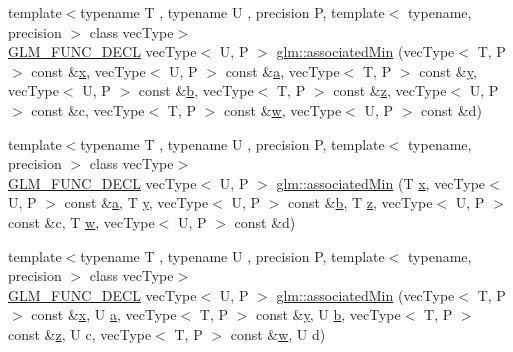 \begin{DoxyCompactItemize}
{\footnotesize template$<$typename T , typename U , precision P, template$<$ typename, precision $>$ class vec\+Type$>$ }\\\mbox{\hyperlink{setup_8hpp_ab2d052de21a70539923e9bcbf6e83a51}{G\+L\+M\+\_\+\+F\+U\+N\+C\+\_\+\+D\+E\+CL}} vec\+Type$<$ U, P $>$ \mbox{\hyperlink{group__gtx__associated__min__max_ga88e031f22b80215505928900d3dde549}{glm\+::associated\+Min}} (vec\+Type$<$ T, P $>$ const \&\mbox{\hyperlink{glad_8h_a92d0386e5c19fb81ea88c9f99644ab1d}{x}}, vec\+Type$<$ U, P $>$ const \&\mbox{\hyperlink{glad_8h_ac8729153468b5dcf13f971b21d84d4e5}{a}}, vec\+Type$<$ T, P $>$ const \&\mbox{\hyperlink{glad_8h_a66ddd433d2cacfe27f5906b7e86faeed}{y}}, vec\+Type$<$ U, P $>$ const \&\mbox{\hyperlink{glad_8h_a6eba317e3cf44d6d26c04a5a8f197dcb}{b}}, vec\+Type$<$ T, P $>$ const \&\mbox{\hyperlink{glad_8h_acb78bf1972d3eaf07da34ff2e0a2f133}{z}}, vec\+Type$<$ U, P $>$ const \&c, vec\+Type$<$ T, P $>$ const \&\mbox{\hyperlink{glad_8h_a1d0296e9e835f2e1ee17634af95fc1ec}{w}}, vec\+Type$<$ U, P $>$ const \&d)
\item 
{\footnotesize template$<$typename T , typename U , precision P, template$<$ typename, precision $>$ class vec\+Type$>$ }\\\mbox{\hyperlink{setup_8hpp_ab2d052de21a70539923e9bcbf6e83a51}{G\+L\+M\+\_\+\+F\+U\+N\+C\+\_\+\+D\+E\+CL}} vec\+Type$<$ U, P $>$ \mbox{\hyperlink{group__gtx__associated__min__max_ga0f63b0dce5a5c3242cc6d9847e7d14f1}{glm\+::associated\+Min}} (T \mbox{\hyperlink{glad_8h_a92d0386e5c19fb81ea88c9f99644ab1d}{x}}, vec\+Type$<$ U, P $>$ const \&\mbox{\hyperlink{glad_8h_ac8729153468b5dcf13f971b21d84d4e5}{a}}, T \mbox{\hyperlink{glad_8h_a66ddd433d2cacfe27f5906b7e86faeed}{y}}, vec\+Type$<$ U, P $>$ const \&\mbox{\hyperlink{glad_8h_a6eba317e3cf44d6d26c04a5a8f197dcb}{b}}, T \mbox{\hyperlink{glad_8h_acb78bf1972d3eaf07da34ff2e0a2f133}{z}}, vec\+Type$<$ U, P $>$ const \&c, T \mbox{\hyperlink{glad_8h_a1d0296e9e835f2e1ee17634af95fc1ec}{w}}, vec\+Type$<$ U, P $>$ const \&d)
\item 
{\footnotesize template$<$typename T , typename U , precision P, template$<$ typename, precision $>$ class vec\+Type$>$ }\\\mbox{\hyperlink{setup_8hpp_ab2d052de21a70539923e9bcbf6e83a51}{G\+L\+M\+\_\+\+F\+U\+N\+C\+\_\+\+D\+E\+CL}} vec\+Type$<$ U, P $>$ \mbox{\hyperlink{group__gtx__associated__min__max_ga00a949fd345f4b31b259f033d3ab4a1c}{glm\+::associated\+Min}} (vec\+Type$<$ T, P $>$ const \&\mbox{\hyperlink{glad_8h_a92d0386e5c19fb81ea88c9f99644ab1d}{x}}, U \mbox{\hyperlink{glad_8h_ac8729153468b5dcf13f971b21d84d4e5}{a}}, vec\+Type$<$ T, P $>$ const \&\mbox{\hyperlink{glad_8h_a66ddd433d2cacfe27f5906b7e86faeed}{y}}, U \mbox{\hyperlink{glad_8h_a6eba317e3cf44d6d26c04a5a8f197dcb}{b}}, vec\+Type$<$ T, P $>$ const \&\mbox{\hyperlink{glad_8h_acb78bf1972d3eaf07da34ff2e0a2f133}{z}}, U c, vec\+Type$<$ T, P $>$ const \&\mbox{\hyperlink{glad_8h_a1d0296e9e835f2e1ee17634af95fc1ec}{w}}, U d)

\end{DoxyCompactItemize}
